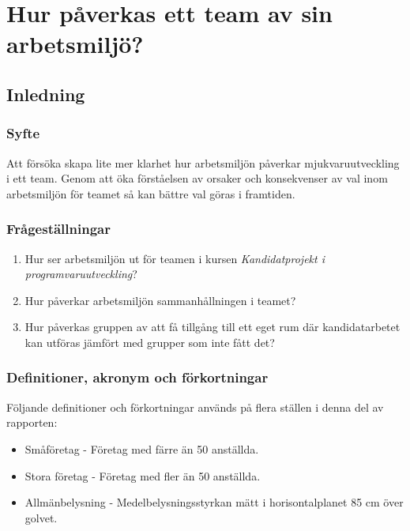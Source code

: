 \chapter{Hur påverkas ett team av sin arbetsmiljö?}
\label{cha:indiv-report-hampus}

\section{Inledning}
\label{sec:introduction-hampus}


\subsection{Syfte}
\label{sec:purpose-hampus}

Att försöka skapa lite mer klarhet hur  arbetsmiljön påverkar mjukvaruutveckling i ett team. Genom att öka förståelsen av orsaker och konsekvenser av val inom arbetsmiljön för teamet så kan bättre val göras i framtiden.

\subsection{Frågeställningar}
\label{sec:issue-hampus}

\begin{enumerate}
\item Hur ser arbetsmiljön ut för teamen i kursen \textit{Kandidatprojekt i programvaruutveckling}?
\item Hur påverkar arbetsmiljön sammanhållningen i teamet?
\item Hur påverkas gruppen av att få tillgång till ett eget rum där kandidatarbetet kan utföras jämfört med grupper som inte fått det?
\end{enumerate}

\subsection{Definitioner, akronym och förkortningar}
Följande definitioner och förkortningar används på flera ställen i denna del av rapporten:

\begin{itemize}
\item Småföretag - Företag med färre än 50 anställda.
\item Stora företag - Företag med fler än 50 anställda.
\item Allmänbelysning - Medelbelysningsstyrkan mätt i horisontalplanet 85 cm över golvet.
\end{itemize}


